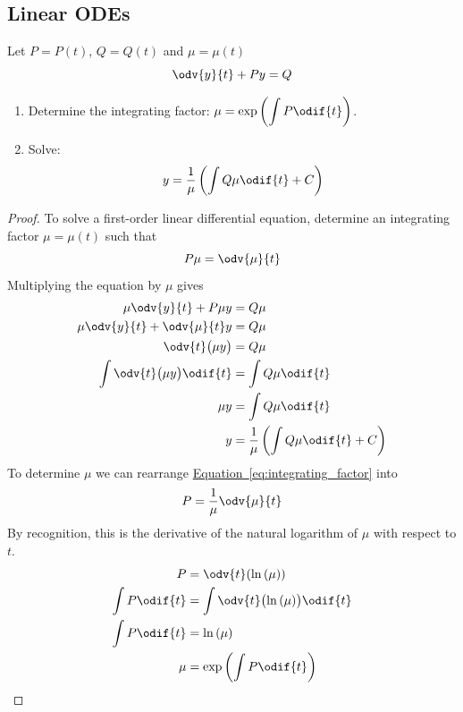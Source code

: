 \documentclass{article}
\begin{document}
\subsection{Linear ODEs}
Let \(P=P(t)\), \(Q=Q(t)\) and \(\mu = \mu(t)\)
\begin{equation*}
    \odv{y}{t} + Py = Q
\end{equation*}
\begin{enumerate}
    \item Determine the integrating factor: \(\displaystyle \mu=\exp{\left( \int P \odif{t} \right)}\).
    \item Solve:
          \begin{equation*}
              y=\frac{1}{\mu}\left(\int Q \mu \odif{t} + C\right)
          \end{equation*}
\end{enumerate}
\begin{proof}
    To solve a first-order linear differential equation, determine an integrating factor \(\mu = \mu(t)\) such that
    \begin{equation}
        P \mu = \odv{\mu}{t} \label{eq:integrating_factor}
    \end{equation}
    Multiplying the equation by \(\mu \) gives
    \begin{align*}
        \mu \odv{y}{t} + P \mu y             & = Q \mu                                           \\
        \mu \odv{y}{t} + \odv{\mu}{t} y       & = Q \mu                                           \\
        \odv{t}\bigl(\mu y\bigr)             & = Q \mu                                           \\
        \int \odv{t}\bigl(\mu y\bigr) \odif{t} & = \int Q \mu \odif{t}                               \\
        \mu y                               & = \int Q \mu \odif{t}                               \\
        y                                   & = \frac{1}{\mu}\left(\int Q \mu \odif{t} + C\right)
    \end{align*}
    To determine \(\mu \) we can rearrange \hyperref[eq:integrating_factor]{Equation~\ref{eq:integrating_factor}} into
    \begin{align*}
        P = \frac{1}{\mu}\odv{\mu}{t}
    \end{align*}
    By recognition, this is the derivative of the natural logarithm of \(\mu \) with respect to \(t\).
    \begin{align*}
        P             & = \odv{t}(\ln{\left( \mu \right)})                       \\
        \int P \odif{t} & = \int \odv{t}\bigl(\ln{\left( \mu \right)}\bigr) \odif{t} \\
        \int P \odif{t} & = \ln{\left( \mu \right)}                               \\
        \mu           & = \exp{\left( \int P \odif{t} \right)}
    \end{align*}
\end{proof}
\end{document}
